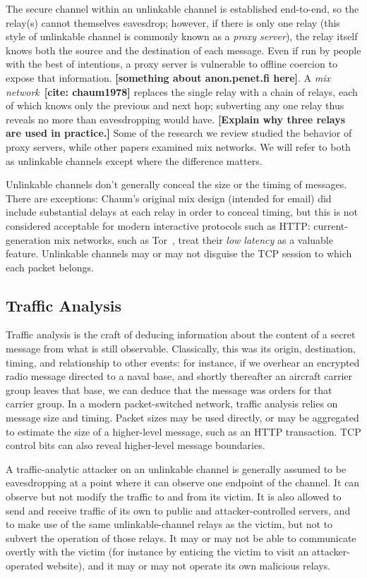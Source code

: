 \documentclass{zarticle}
\def\todo#1{{\color{todocolor}\bfseries [#1]}}
\def\needcite#1{\todo{cite: #1}}
\begin{document}
The secure channel within an unlinkable channel is established
end-to-end, so the relay(s) cannot themselves eavesdrop; however, if
there is only one relay (this style of unlinkable channel is commonly
known as a \emph{proxy server}), the relay itself knows both the
source and the destination of each message.  Even if run by people
with the best of intentions, a proxy server is vulnerable to offline
coercion to expose that information. \todo{something about
  anon.penet.fi here}.  A \emph{mix network}~\needcite{chaum1978}
replaces the single relay with a chain of relays, each of which knows
only the previous and next hop; subverting any one relay thus reveals
no more than eavesdropping would have. \todo{Explain why three relays
  are used in practice.}  Some of the research we review studied the
behavior of proxy servers, while other papers examined mix networks.
We will refer to both as unlinkable channels except where the
difference matters.

Unlinkable channels don't generally conceal the size or the timing of
messages.  There are exceptions: Chaum's original mix design (intended
for email) did include substantial delays at each relay in order to
conceal timing, but this is not considered acceptable for modern
interactive protocols such as HTTP: current-generation mix networks,
such as Tor~\cite{dingledine2004tor}, treat their \emph{low latency}
as a valuable feature.  Unlinkable channels may or may not disguise
the TCP session to which each packet belongs.

\subsection{Traffic Analysis}

Traffic analysis is the craft of deducing information about the
content of a secret message from what is still observable.
Classically, this was its origin, destination, timing, and
relationship to other events: for instance, if we overhear an
encrypted radio message directed to a naval base, and shortly
thereafter an aircraft carrier group leaves that base, we can deduce
that the message was orders for that carrier group.  In a modern
packet-switched network, traffic analysis relies on message size and
timing.  Packet sizes may be used directly, or may be aggregated to
estimate the size of a higher-level message, such as an HTTP
transaction.  TCP control bits can also reveal higher-level message
boundaries.

A traffic-analytic attacker on an unlinkable channel is generally
assumed to be eavesdropping at a point where it can observe one
endpoint of the channel.  It can observe but not modify the traffic to
and from its victim.  It is also allowed to send and receive traffic
of its own to public and attacker-controlled servers, and to make use
of the same unlinkable-channel relays as the victim, but not to
subvert the operation of those relays.  It may or may not be able to
communicate overtly with the victim (for instance by enticing the
victim to visit an attacker-operated website), and it may or may not
operate its own malicious relays.
\end{document}
